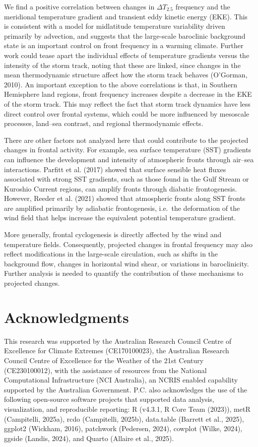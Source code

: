 \documentclass[
]{agujournal2019}
\begin{document}
We find a positive correlation between changes in \(\Delta T_{2.5}\)
frequency and the meridional temperature gradient and transient eddy
kinetic energy (EKE). This is consistent with a model for midlatitude
temperature variability driven primarily by advection, and suggests that
the large-scale baroclinic background state is an important control on
front frequency in a warming climate. Further work could tease apart the
individual effects of temperature gradients versus the intensity of the
storm track, noting that these are linked, since changes in the mean
thermodynamic structure affect how the storm track behaves (O'Gorman,
2010). An important exception to the above correlations is that, in
Southern Hemisphere land regions, front frequency increases despite a
decrease in the EKE of the storm track. This may reflect the fact that
storm track dynamics have less direct control over frontal systems,
which could be more influenced by mesoscale processes, land--sea
contrast, and regional thermodynamic effects.

There are other factors not analyzed here that could contribute to the
projected changes in frontal activity. For example, sea surface
temperature (SST) gradients can influence the development and intensity
of atmospheric fronts through air--sea interactions. Parfitt et al.
(2017) showed that surface sensible heat fluxes associated with strong
SST gradients, such as those found in the Gulf Stream or Kuroshio
Current regions, can amplify fronts through diabatic frontogenesis.
However, Reeder et al. (2021) showed that atmospheric fronts along SST
fronts are amplified primarily by adiabatic frontogenesis, i.e.~the
deformation of the wind field that helps increase the equivalent
potential temperature gradient.

More generally, frontal cyclogenesis is directly affected by the wind
and temperature fields. Consequently, projected changes in frontal
frequency may also reflect modifications in the large-scale circulation,
such as shifts in the background flow, changes in horizontal wind shear,
or variations in baroclinicity. Further analysis is needed to quantify
the contribution of these mechanisms to projected changes.

\section{Acknowledgments}\label{acknowledgments}

This research was supported by the Australian Research Council Centre of
Excellence for Climate Extremes (CE170100023), the Australian Research
Council Centre of Excellence for the Weather of the 21st Century
(CE230100012), with the assistance of resources from the National
Computational Infrastructure (NCI Australia), an NCRIS enabled
capability supported by the Australian Government. P.C. also
acknowledges the use of the following open-source software projects that
supported data analysis, visualization, and reproducible reporting: R
(v4.3.1, R Core Team (2023)), metR (Campitelli, 2025a), rcdo
(Campitelli, 2025b), data.table (Barrett et al., 2025), ggplot2
(Wickham, 2016), patchwork (Pedersen, 2024), cowplot (Wilke, 2024),
ggside (Landis, 2024), and Quarto (Allaire et al., 2025).
\end{document}
